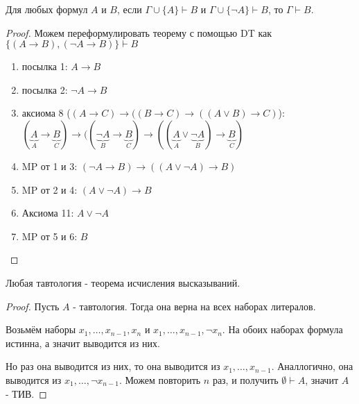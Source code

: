 \begin{lemma} \thmslashn

    Для любых формул $A$ и $B$, если $\Gamma \cup \{A\} \vdash B$ и $\Gamma \cup \{\neg A\} \vdash B $, то $\Gamma \vdash B$.
    \begin{proof} \thmslashn

        Можем переформулировать теорему с помощью DT как $\{(A \to B), (\neg A \to B)\} \vdash B $ 
        \begin{enumerate}
            \item посылка 1: $A\to B$
            \item посылка 2: $\neg A \to B$
            \item аксиома 8 ($(A \to C) \to ((B \to C) \to ((A \lor B) \to C)$): \\
                $(\underbrace{A}_{A} \to \underbrace{B}_{C}) \to ((\underbrace{\neg A}_{B} \to \underbrace{B}_{C}) \to ((\underbrace{A}_{A} \lor \underbrace{\neg A}_{B} ) \to \underbrace{B}_{C} ) $
            \item MP от 1 и 3: $(\neg A \to B) \to ((A \lor \neg A) \to B)$
            \item MP от 2 и 4: $(A \lor \neg A) \to B$
            \item Аксиома 11: $A \lor \neg A$
            \item MP от 5 и 6: $B$
        \end{enumerate}
    \end{proof}
\end{lemma}
\begin{theorem} \thmslashn

    Любая тавтология - теорема исчисления высказываний.
    \begin{proof} \thmslashn

        Пусть $A$ - тавтология. Тогда она верна на всех наборах литералов.

        Возьмём наборы $x_1, \ldots, x_{n-1}, x_{n}$ и $x_1, \ldots, x_{n-1}, \neg x_{n}$. На обоих наборах формула истинна, а значит выводится из них. 

        Но раз она выводится из них, то она выводится из $x_1, \ldots, x_{n-1}$. Аналлогично, она выводится из $x_1, \ldots, \neg x_{n-1}$. Можем повторить $n$ раз, и получить $ \emptyset \vdash A$, значит $A$ - ТИВ.

    \end{proof}
\end{theorem}
